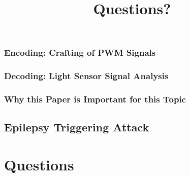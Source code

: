 \documentclass[11pt,t,usepdftitle=false,aspectratio=169]{beamer}
\begin{document}
\subsubsection{Encoding: Crafting of PWM Signals}%
\label{sub:encoding_crafting_of_pwm_signals}


\subsubsection{Decoding: Light Sensor Signal Analysis}%
\label{sub:decoding_light_sensor_signal_analysis}

\subsubsection{Why this Paper is Important for this Topic}%
\label{sub:why_this_paper_is_important_for_this_topic}


\subsection{Epilepsy Triggering Attack}%
\label{sub:epilepsy_triggering_attack}

\title{Questions?}
\subtitle{}
\section{Questions}


\appendix
\end{document}
